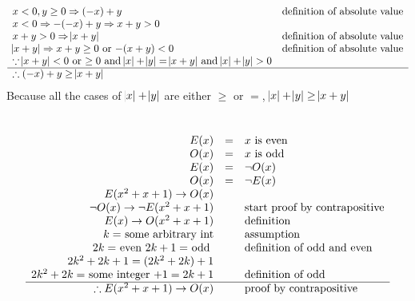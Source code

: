 \documentclass[letterpaper]{article}
\begin{document}
       \subsubsection{}
        	\begin{displaymath}
        		\begin{array}{ll}
                	x < 0, y \geq 0 \Rightarrow (-x) + y & $definition of absolute value$\\
                    x < 0 \Rightarrow -(-x) + y \Rightarrow x + y > 0 &\\
                    x + y > 0 \Rightarrow \abs{x + y} & $definition of absolute value$\\
                    \abs{x + y} \Rightarrow x + y \geq 0 $ or $ -(x + y) < 0 & $definition of absolute value$\\
                    \because \abs{x + y} < 0 $ or $ \geq 0 $ and $ \abs{x} + \abs{y} = \abs{x + y} $ and $ \abs{x} + \abs{y} > 0&\\
                    \hline
                    \therefore (-x) + y \geq \abs{x + y} &\\
                \end{array} 
        	\end{displaymath}
    Because all the cases of $\abs{x} + \abs{y}$ are either $\geq$ or $=$, $\abs{x} + \abs{y} \geq \abs{x + y}$\\
	\section{}
    	\begin{displaymath}
    		\begin{array}{rll}
    			E(x) &=& x $ is even$\\
                O(x) &=& x $ is odd$\\
                E(x) &=& \neg O(x)\\
                O(x) &=& \neg E(x)\\
                E(x^2 + x + 1) \rightarrow O(x) &&\\
                \neg O(x) \rightarrow \neg E(x^2 + x + 1) && $start proof by contrapositive$\\
                E(x) \rightarrow O(x^2 + x + 1) && $definition$\\
                k = $ some arbitrary int$ && $assumption$\\
                2k = $ even $ 2k + 1 = $ odd $ && $definition of odd and even$\\
               	2k^2 + 2k + 1 = (2k^2 + 2k) + 1 &&\\
                2k^2 + 2k = $ some integer $ + 1 = 2k + 1 && $definition of odd$\\
                \hline
                \therefore E(x^2 + x + 1) \rightarrow O(x) && $proof by contrapositive$\\
    		\end{array}
    	\end{displaymath}
\end{document}
